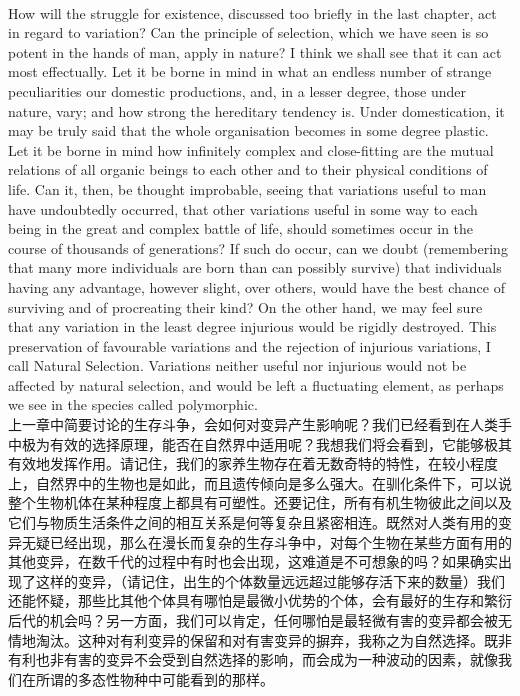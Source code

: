 \documentclass{article}
\begin{document}
\\
How will the struggle for existence, discussed too briefly in the last chapter, act in regard to variation? Can the principle of selection, which we have seen is so potent in the hands of man, apply in nature? I think we shall see that it can act most effectually. Let it be borne in mind in what an endless number of strange peculiarities our domestic productions, and, in a lesser degree, those under nature, vary; and how strong the hereditary tendency is. Under domestication, it may be truly said that the whole organisation becomes in some degree plastic. Let it be borne in mind how infinitely complex and close-fitting are the mutual relations of all organic beings to each other and to their physical conditions of life. Can it, then, be thought improbable, seeing that variations useful to man have undoubtedly occurred, that other variations useful in some way to each being in the great and complex battle of life, should sometimes occur in the course of thousands of generations? If such do occur, can we doubt (remembering that many more individuals are born than can possibly survive) that individuals having any advantage, however slight, over others, would have the best chance of surviving and of procreating their kind? On the other hand, we may feel sure that any variation in the least degree injurious would be rigidly destroyed. This preservation of favourable variations and the rejection of injurious variations, I call Natural Selection. Variations neither useful nor injurious would not be affected by natural selection, and would be left a fluctuating element, as perhaps we see in the species called polymorphic.\\
上一章中简要讨论的生存斗争，会如何对变异产生影响呢？我们已经看到在人类手中极为有效的选择原理，能否在自然界中适用呢？我想我们将会看到，它能够极其有效地发挥作用。请记住，我们的家养生物存在着无数奇特的特性，在较小程度上，自然界中的生物也是如此，而且遗传倾向是多么强大。在驯化条件下，可以说整个生物机体在某种程度上都具有可塑性。还要记住，所有有机生物彼此之间以及它们与物质生活条件之间的相互关系是何等复杂且紧密相连。既然对人类有用的变异无疑已经出现，那么在漫长而复杂的生存斗争中，对每个生物在某些方面有用的其他变异，在数千代的过程中有时也会出现，这难道是不可想象的吗？如果确实出现了这样的变异，（请记住，出生的个体数量远远超过能够存活下来的数量）我们还能怀疑，那些比其他个体具有哪怕是最微小优势的个体，会有最好的生存和繁衍后代的机会吗？另一方面，我们可以肯定，任何哪怕是最轻微有害的变异都会被无情地淘汰。这种对有利变异的保留和对有害变异的摒弃，我称之为自然选择。既非有利也非有害的变异不会受到自然选择的影响，而会成为一种波动的因素，就像我们在所谓的多态性物种中可能看到的那样。\\ 
\end{document}
